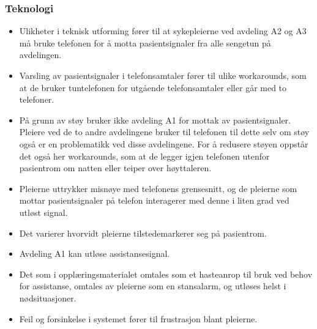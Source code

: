 \subsubsection{Teknologi}
\begin{itemize}
\item Ulikheter i teknisk utforming fører til at sykepleierne ved avdeling A2 og A3 må bruke telefonen for å motta pasientsignaler fra alle sengetun på avdelingen.

\item Varsling av pasientsignaler i telefonsamtaler fører til ulike workarounds, som at de bruker tuntelefonen for utgående telefonsamtaler eller går med to telefoner.

\item På grunn av støy bruker ikke avdeling A1 for mottak av pasientsignaler. Pleiere ved de to andre avdelingene bruker til telefonen til dette selv om støy også er en problematikk ved disse avdelingene. For å redusere støyen oppstår det også her workarounds, som at de legger igjen telefonen utenfor pasientrom om natten eller teiper over høyttaleren.

\item Pleierne uttrykker misnøye med telefonens grensesnitt, og de pleierne som mottar pasientsignaler på telefon interagerer med denne i liten grad ved utløst signal.

\item Det varierer hvorvidt pleierne tilstedemarkerer seg på pasientrom.

\item Avdeling A1 kan utløse assistansesignal. 

\item Det som i opplæringsmaterialet omtales som et hasteanrop til bruk ved behov for assistanse, omtales av pleierne som en stansalarm, og utløses helst i nødsituasjoner.

\item Feil og forsinkelse i systemet fører til frustrasjon blant pleierne.

\end{itemize}

